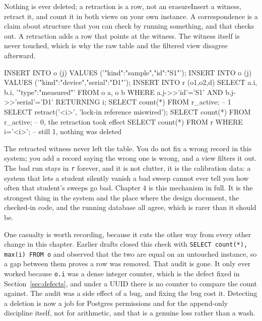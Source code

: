 \begin{Correspondence}{Nothing is ever deleted; a retraction is a row, not an erasure}{Insert a witness, retract it, and count it in both views on your own instance.}
A correspondence is a claim about structure that you can check by running something, and that checks out. A retraction adds a row that points at the witness. The witness itself is never touched, which is why the raw table and the filtered view disagree afterward.
\begin{Check}
INSERT INTO o (j) VALUES ('{"kind":"sample","id":"S1"}');
INSERT INTO o (j) VALUES ('{"kind":"device","serial":"D1"}');
INSERT INTO r (o1,o2,d)
  SELECT a.i, b.i, '{"type":"measured"}' FROM o a, o b
  WHERE a.j->>'id'='S1' AND b.j->>'serial'='D1'
  RETURNING i;
SELECT count(*) FROM r_active;         -- 1
SELECT retract('<i>', 'lock-in reference miswired');
SELECT count(*) FROM r_active;         -- 0, the retraction took effect
SELECT count(*) FROM r WHERE i='<i>';  -- still 1, nothing was deleted
\end{Check}
The retracted witness never left the table. You do not fix a wrong record in this system; you add a record saying the wrong one is wrong, and a view filters it out. The bad run stays in \texttt{r} forever, and it is not clutter, it is the calibration data: a system that lets a student silently vanish a bad sweep cannot ever tell you how often that student's sweeps go bad. Chapter 4 is this mechanism in full. It is the strongest thing in the system and the place where the design document, the checked-in code, and the running database all agree, which is rarer than it should be.

One casualty is worth recording, because it cuts the other way from every other change in this chapter. Earlier drafts closed this check with \texttt{SELECT count(*), max(i) FROM o} and observed that the two are equal on an untouched instance, so a gap between them proves a row was removed. That audit is gone. It only ever worked because \texttt{o.i} was a dense integer counter, which is the defect fixed in Section~\ref{sec:defects}, and under a UUID there is no counter to compare the count against. The audit was a side effect of a bug, and fixing the bug cost it. Detecting a deletion is now a job for Postgres permissions and for the append-only discipline itself, not for arithmetic, and that is a genuine loss rather than a wash.
\end{Correspondence}


